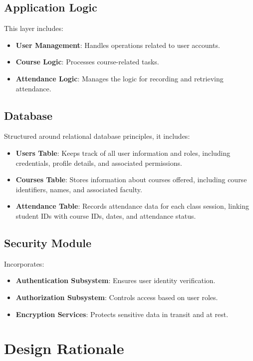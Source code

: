 \documentclass[letterpaper,12pt,oneside,listof=totoc]{scrreprt}
\begin{document}
\subsection{Application Logic}
This layer includes:
\begin{itemize}
    \item \textbf{User Management}: Handles operations related to user accounts.
    \item \textbf{Course Logic}: Processes course-related tasks.
    \item \textbf{Attendance Logic}: Manages the logic for recording and retrieving attendance.
\end{itemize}

\subsection{Database}
Structured around relational database principles, it includes:
\begin{itemize}
    \item \textbf{Users Table}: Keeps track of all user information and roles, including credentials, profile details, and associated permissions.
    \item \textbf{Courses Table}: Stores information about courses offered, including course identifiers, names, and associated faculty.
    \item \textbf{Attendance Table}: Records attendance data for each class session, linking student IDs with course IDs, dates, and attendance status.
\end{itemize}

\subsection{Security Module}
Incorporates:
\begin{itemize}
    \item \textbf{Authentication Subsystem}: Ensures user identity verification.
    \item \textbf{Authorization Subsystem}: Controls access based on user roles.
    \item \textbf{Encryption Services}: Protects sensitive data in transit and at rest.
\end{itemize}

\section{Design Rationale}
\end{document}
